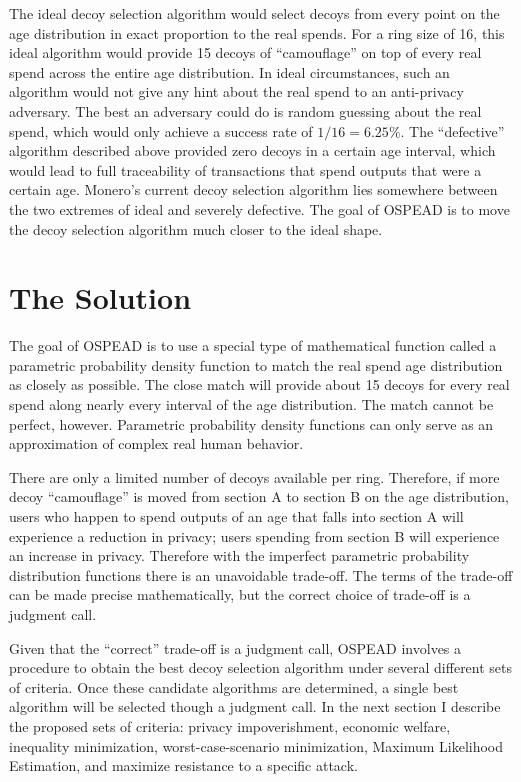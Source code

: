\documentclass[english]{article}
\begin{document}
The ideal decoy selection algorithm would select decoys from every
point on the age distribution in exact proportion to the real spends.
For a ring size of 16, this ideal algorithm would provide 15 decoys
of ``camouflage'' on top of every real spend across the entire age
distribution. In ideal circumstances, such an algorithm would not
give any hint about the real spend to an anti-privacy adversary. The
best an adversary could do is random guessing about the real spend,
which would only achieve a success rate of $1/16=6.25\%$. The ``defective''
algorithm described above provided zero decoys in a certain age interval,
which would lead to full traceability of transactions that spend outputs
that were a certain age. Monero's current decoy selection algorithm
lies somewhere between the two extremes of ideal and severely defective.
The goal of OSPEAD is to move the decoy selection algorithm much closer
to the ideal shape.

\section{The Solution\label{sec:The-Solution}}

The goal of OSPEAD is to use a special type of mathematical function
called a parametric probability density function to match the real
spend age distribution as closely as possible. The close match will
provide about 15 decoys for every real spend along nearly every interval
of the age distribution. The match cannot be perfect, however. Parametric
probability density functions can only serve as an approximation of
complex real human behavior.

There are only a limited number of decoys available per ring. Therefore,
if more decoy ``camouflage'' is moved from section A to section
B on the age distribution, users who happen to spend outputs of an
age that falls into section A will experience a reduction in privacy;
users spending from section B will experience an increase in privacy.
Therefore with the imperfect parametric probability distribution functions
there is an unavoidable trade-off. The terms of the trade-off can
be made precise mathematically, but the correct choice of trade-off
is a judgment call.

Given that the ``correct'' trade-off is a judgment call, OSPEAD
involves a procedure to obtain the best decoy selection algorithm
under several different sets of criteria. Once these candidate algorithms
are determined, a single best algorithm will be selected though a
judgment call. In the next section I describe the proposed sets of
criteria: privacy impoverishment, economic welfare, inequality minimization,
worst-case-scenario minimization, Maximum Likelihood Estimation, and
maximize resistance to a specific attack.
\end{document}
